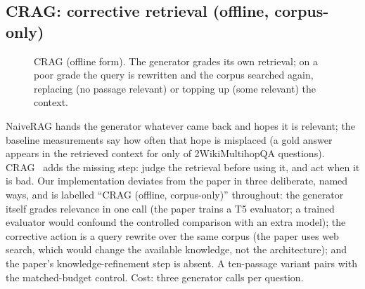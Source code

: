 \subsection{CRAG: corrective retrieval (offline, corpus-only)}
\label{sec:arch-crag}

\begin{figure}[t]
\centering
{}
\caption{CRAG (offline form). The generator grades its own retrieval; on a
poor grade the query is rewritten and the corpus searched again, replacing
(no passage relevant) or topping up (some relevant) the context.}
\label{fig:arch-crag}
\end{figure}

NaiveRAG hands the generator whatever came back and hopes it is relevant;
the baseline measurements say how often that hope is misplaced (a gold
answer appears in the retrieved context for only
\NaiveRAGTwoWikiAnswerInContext{} of 2WikiMultihopQA questions).
CRAG~\cite{yan2024crag} adds the missing step: judge the retrieval before
using it, and act when it is bad. Our implementation deviates from the
paper in three deliberate, named ways, and is labelled ``CRAG (offline,
corpus-only)'' throughout: the generator itself grades relevance in one
call (the paper trains a T5 evaluator; a trained evaluator would confound
the controlled comparison with an extra model); the corrective action is a
query rewrite over the same corpus (the paper uses web search, which would
change the available knowledge, not the architecture); and the paper's
knowledge-refinement step is absent. A ten-passage variant pairs with the
matched-budget control. Cost: three generator calls per question.

